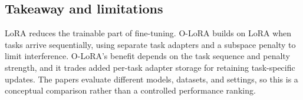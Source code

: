\subsection{Takeaway and limitations}

LoRA reduces the trainable part of fine-tuning. O-LoRA builds on LoRA when tasks arrive sequentially, using separate task adapters and a subspace penalty to limit interference. O-LoRA's benefit depends on the task sequence and penalty strength, and it trades added per-task adapter storage for retaining task-specific updates. The papers evaluate different models, datasets, and settings, so this is a conceptual comparison rather than a controlled performance ranking.
